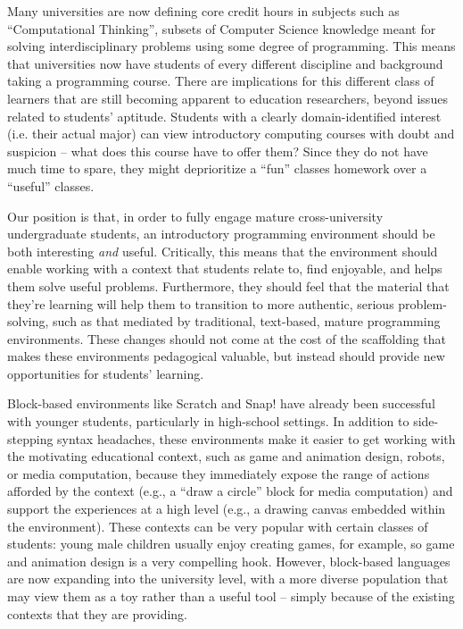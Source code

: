 \documentclass{sig-alternate}
\begin{document}
Many universities are now defining core credit hours in subjects such as ``Computational Thinking'', subsets of Computer Science knowledge meant for solving interdisciplinary problems using some degree of programming.
This means that universities now have students of every different discipline and background taking a programming course.
There are implications for this different class of learners that are still becoming apparent to education researchers, beyond issues related to students' aptitude.
Students with a clearly domain-identified interest (i.e. their actual major) can view introductory computing courses with doubt and suspicion -- what does this course have to offer them?
Since they do not have much time to spare, they might deprioritize a ``fun'' classes homework over a ``useful'' classes.

Our position is that, in order to fully engage mature cross-university undergraduate students, an introductory programming environment should be both interesting \textit{and} useful.
Critically, this means that the environment should enable working with a context that students relate to, find enjoyable, and helps them solve useful problems.
Furthermore, they should feel that the material that they're learning will help them to transition to more authentic, serious problem-solving, such as that mediated by traditional, text-based, mature programming environments.
These changes should not come at the cost of the scaffolding that makes these environments pedagogical valuable, but instead should provide new opportunities for students' learning.

Block-based environments like Scratch and Snap! have already been successful with younger students, particularly in high-school settings.
In addition to side-stepping syntax headaches, these environments make it easier to get working with the motivating educational context, such as game and animation design, robots, or media computation, because they immediately expose the range of actions afforded by the context (e.g., a ``draw a circle'' block for media computation) and support the experiences at a high level (e.g., a drawing canvas embedded within the environment).
These contexts can be very popular with certain classes of students: young male children usually enjoy creating games, for example, so game and animation design is a very compelling hook.
However, block-based languages are now expanding into the university level, with a more diverse population that may view them as a toy rather than a useful tool -- simply because of the existing contexts that they are providing.
\end{document}
